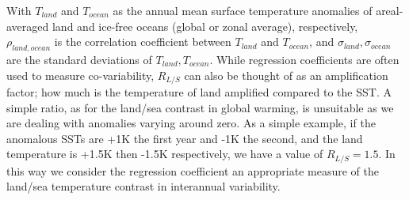 With $T_{land}$ and $T_{ocean}$ as the annual mean surface temperature anomalies 
of areal-averaged land and ice-free oceans (global or zonal average), 
respectively, $\rho_{land,ocean}$ is the correlation coefficient between 
$T_{land}$ and $T_{ocean}$, and $\sigma_{land}, \sigma_{ocean}$ are the standard 
deviations of $T_{land}, T_{ocean}$. While regression coefficients are often 
used to measure co-variability, $R_{L/S}$ can also be thought of as an 
amplification factor; how much is the temperature of land amplified compared to 
the SST. A simple ratio, as for the land/sea contrast in global warming, is 
unsuitable as we are dealing with anomalies varying around zero. As a simple 
example, if the anomalous SSTs are +1K the first year and -1K the second, and 
the land temperature is +1.5K then -1.5K respectively, we have a value of 
$R_{L/S} = 1.5$. In this way we consider the regression coefficient an 
appropriate measure of the land/sea temperature contrast in interannual 
variability.
